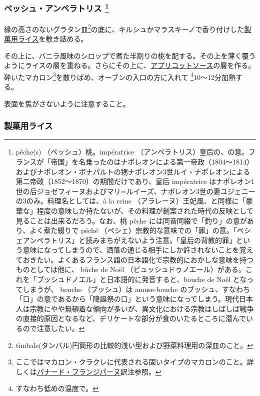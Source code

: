 \begin{Main}
{\subsubsection[ペッシュ・アンペラトリス
]{\texorpdfstring{ペッシュ・アンペラトリス \footnote{pêche(s)
  （ペッシュ）桃。impératrice
  （アンペラトリス）皇后の、の意。フランスが「帝国」を名乗ったのはナポレオンによる第一帝政（1804〜1814）およびナポレオン・ボナパルトの甥ナポレオン3世ルイ・ナポレオンによる第二帝政（1852〜1870）の期間だけであり、皇后
  impératrice
  はナポレオン1世の后ジョゼフィーヌおよびマリ=ルイーズ、ナポレオン3世の妻ユジェニーの3のみ。料理名としては、à
  la reine
  （アラレーヌ）王妃風、と同様に「豪華な」程度の意味しか持たないが、その料理が創案された時代の反映として見ることは出来るだろう。なお、桃
  pêche には同音同綴で「釣り」の意があり、よく煮た綴りで péché
  （ペシェ）宗教的な意味での「罪」の意。「ペシェアンペラトリス」と読みまちがえないよう注意。「皇后の背教的罪」という意味になってしまうので、洒落の通じる相手にしか許されないことを覚えておきたい。よくあるフランス語の日本語化で宗教的におかしな意味を持つものとしては他に、
  bûche de Noël
  （ビュッシュドゥノエール）がある。これを「ブッシュドノエル」と日本語的に発音すると、bouche
  de Noël となってしまうが、 bouche （ブッシュ）は amuse-bouche
  のブッシュ、すなわち「口」の意であるから「降誕祭の口」という意味になってしまう。現代日本人は宗教にやや無頓着な傾向が多いが、異文化における宗教はしばしば戦争の直接的原因となるなど、デリケートな部分が食のいたるところに潜んでいるので注意したい。}}{ペッシュ・アンペラトリス }}\label{peches-imperatrice}}


縁の高さのないグラタン皿\footnote{timbale(タンバル)円筒形の比較的浅い型および野菜料理用の深皿のこと。}の底に、キルシュかマラスキーノで香り付けした\protect\hyperlink{riz-pour-entremets}{製菓用ライス}を敷き詰める。

その上に、バニラ風味のシロップで煮た半割りの桃を配する。その上を薄く覆うようにライスの層を重ねる。さらにその上に、\protect\hyperlink{}{アプリコットソース}の層を作る。砕いたマカロン\footnote{ここではマカロン・クラクレに代表される固いタイプのマカロンのこと。詳しくは\protect\hyperlink{panade-frangipane}{パナード・フランジパーヌ}訳注参照。}を散りばめ、オーブンの入口の方に入れて
\footnote{すなわち低めの温度で。}10〜12分加熱する。

表面を焦がさないように注意すること。

\hypertarget{riz-pour-entremets}{%
\subsubsection{製菓用ライス}\label{riz-pour-entremets}}


\end{Main}
